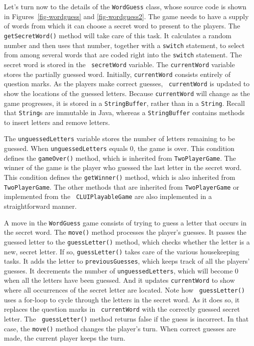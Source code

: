 Let's turn now to the details of the {\tt WordGuess} class, whose
source code is shown in Figures~\ref{fig-wordguess} and
\ref{fig-wordguess2}.  The game needs to have a supply of words from
which it can choose a secret word to present to the players.  The {\tt
getSecretWord()} method will take care of this task. It calculates a
random number and then uses that number, together with a {\tt switch}
statement, to select from among several words that are coded right into
the {\tt switch} statement.  The secret word is stored in the {\tt
secretWord} variable.  The {\tt currentWord} variable stores the
partially guessed word. Initially, {\tt currentWord} consists entirely
of question marks.  As the players make correct guesses, {\tt
currentWord} is updated to show the locations of the guessed letters.
Because {\tt currentWord} will change as the game progresses, it is
stored in a {\tt StringBuffer}, rather than in a {\tt String}. Recall
that {\tt String}s are immutable in Java, whereas a {\tt StringBuffer}
contains methods to insert letters and remove letters.

The {\tt unguessedLetters} variable stores the number of letters
remaining to be guessed.  When {\tt unguessedLetters} equals 0, the
game is over.  This condition defines the {\tt gameOver()}
method, which is inherited from {\tt TwoPlayerGame}.  The winner of
the game is the player who guessed the last letter in the secret word.
This condition defines the {\tt getWinner()} method, which
is also inherited from {\tt TwoPlayerGame}. The other methods that are
inherited from {\tt TwoPlayerGame} or implemented from the {\tt
CLUIPlayableGame} are also implemented in a straightforward manner.

A move in the {\tt WordGuess} game consists of trying to guess a
letter that occurs in the secret word. The {\tt move()} method
processes the player's guesses. It passes the guessed letter to the
{\tt guessLetter()} method, which checks whether the letter is a new,
secret letter. If so, {\tt guessLetter()} takes care of the various
housekeeping tasks. It adds the letter to {\tt previousGuesses},
which keeps track of all the players' guesses.  It decrements the
number of {\tt unguessedLetters}, which will become 0 when all the
letters have been guessed. And it updates {\tt currentWord} to show
where all occurrences of the secret letter are located.  Note how {\tt
guessLetter()} uses a for-loop to cycle through the letters in the
secret word. As it does so, it replaces the question marks in {\tt
currentWord} with the correctly guessed secret letter.  The {\tt
guessLetter()} method returns false if the guess is incorrect.  In
that case, the {\tt move()} method changes the player's turn.  When
correct guesses are made, the current player keeps the turn.

